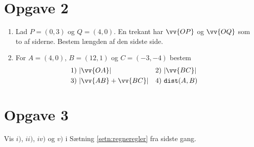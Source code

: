 \section*{Opgave 2}
\begin{enumerate}[label=\roman*)]
\item Lad $P = (0,3)$ og $Q = (4,0)$. En trekant har $\vv{OP}$ og $\vv{OQ}$ som to af siderne. Bestem længden af den sidste side. 
\item For $A = (4,0)$, $B = (12,1)$ og $C = (-3,-4)$ bestem
\begin{align*}
&1) \ |\vv{OA}|   &&2) \ |\vv{BC}|     \\
&3) \  |\vv{AB} + \vv{BC}|  &&4) \  \texttt{dist}(A,B)   \\
\end{align*} 
\end{enumerate}

\section*{Opgave 3}

Vis $i)$, $ii)$, $iv)$ og $v)$ i Sætning \ref{setn:regneregler} fra sidste gang.
